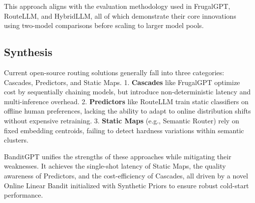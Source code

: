 This approach aligns with the evaluation methodology used in FrugalGPT, RouteLLM, and HybridLLM, all of which demonstrate their core innovations using two-model comparisons before scaling to larger model pools.

\subsection{Synthesis}

Current open-source routing solutions generally fall into three categories: Cascades, Predictors, and Static Maps.
1. \textbf{Cascades} like FrugalGPT optimize cost by sequentially chaining models, but introduce non-deterministic latency and multi-inference overhead.
2. \textbf{Predictors} like RouteLLM train static classifiers on offline human preferences, lacking the ability to adapt to online distribution shifts without expensive retraining.
3. \textbf{Static Maps} (e.g., Semantic Router) rely on fixed embedding centroids, failing to detect hardness variations within semantic clusters.

BanditGPT unifies the strengths of these approaches while mitigating their weaknesses. It achieves the single-shot latency of Static Maps, the quality awareness of Predictors, and the cost-efficiency of Cascades, all driven by a novel Online Linear Bandit initialized with Synthetic Priors to ensure robust cold-start performance.

\begin{table}[h]
\centering
\caption{When to Choose What: Decision Matrix}
\label{tab:decision_matrix}
\end{table}
